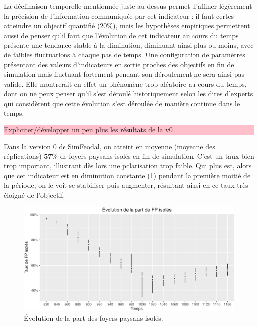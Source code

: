 La \og déclinaison temporelle\fg{} mentionnée juste au dessus permet d'affiner légèrement la précision de l'information communiquée par cet indicateur : il faut certes atteindre un objectif quantifié ($20\%$), mais les hypothèses empiriques permettent aussi de penser qu'il faut que l'évolution de cet indicateur au cours du temps présente une tendance stable à la diminution, diminuant ainsi plus ou moins, avec de faibles fluctuations à chaque pas de temps.
Une configuration de paramètres présentant des valeurs d'indicateurs en sortie proches des objectifs en fin de simulation mais fluctuant fortement pendant son déroulement ne sera ainsi pas valide. Elle montrerait en effet  un phénomène trop aléatoire au cours du temps, dont on ne peux penser qu'il s'est déroulé historiquement selon les dires d'experts qui considèrent que cette évolution s'est déroulée de manière continue dans le temps.

\begin{mdframed}[backgroundcolor=gray!10,footnoteinside=false]
	
	\colorbox{pink}{\parbox{0.9\textwidth}{%
			\vskip5pt
			Expliciter/développer un peu plus les résultats de la v0
			\vskip5pt
		}
	}	
	
	Dans la version 0 de SimFeodal, on atteint en moyenne (moyenne des réplications) $\textbf{57\%}$ de foyers paysans isolés en fin de simulation.
	C'est un taux bien trop important, illustrant dès lors une polarisation trop faible. Qui plus est, alors que cet indicateur est en diminution constante (\cref{fig:taux-isoles-v0}) pendant la première moitié de la période, on le voit se stabiliser puis augmenter, résultant ainsi en ce taux très éloigné de l'objectif.
\end{mdframed}

\begin{figure}[H]
	\captionsetup{width=\linewidth}
	\includegraphics[width=\linewidth]{img/resultats/v0_taux_FP_isoles.pdf}
	\caption{Évolution de la part des foyers paysans isolés.} 
	\label{fig:taux-isoles-v0} 
\end{figure}

